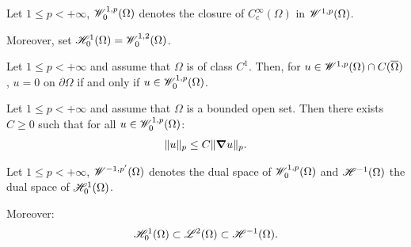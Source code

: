 \begin{definition}
    Let $1 \leq p < +\infty$, $\mathscr{W}^{1, p}_0(\Omega)$ denotes the closure of $C_c^{\infty}(\Omega)$ in $\mathscr{W}^{1, p}(\Omega)$.

    Moreover, set $\mathscr{H}^{1}_0(\Omega) = \mathscr{W}^{1, 2}_0(\Omega)$.
\end{definition}

\begin{theorem}
    Let $1 \leq p < +\infty$ and assume that $\Omega$ is of class $C^1$. Then, for $u \in \mathscr{W}^{1, p}(\Omega) \cap C(\overline{\Omega})$, $u = 0$ on $\partial \Omega$ if and only if $u \in \mathscr{W}^{1, p}_0(\Omega)$.
\end{theorem}

\begin{theorem}
    Let $1 \leq p < +\infty$ and assume that $\Omega$ is a bounded open set. Then there exists $C \geq 0$ such that for all $u \in \mathscr{W}^{1, p}_0(\Omega)$:
    \begin{gather}
        \lVert u \rVert_p \leq C \lVert \bm{\nabla} u \rVert_p.
    \end{gather}
\end{theorem}

\begin{definition}
    Let $1 \leq p < +\infty$, $\mathscr{W}^{-1, p^{\prime}}(\Omega)$ denotes the dual space of $\mathscr{W}^{1, p}_0(\Omega)$ and $\mathscr{H}^{-1}(\Omega)$ the dual space of $\mathscr{H}^{1}_0(\Omega)$.

    Moreover:
    \begin{gather}
        \mathscr{H}^{1}_0(\Omega) \subset \mathscr{L}^{2}(\Omega) \subset \mathscr{H}^{-1}(\Omega).
    \end{gather}
\end{definition}